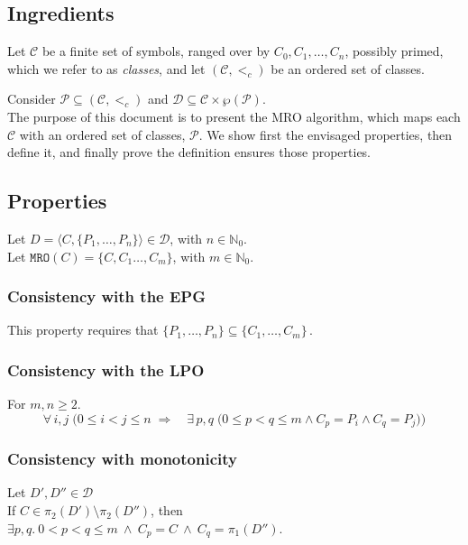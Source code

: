 \documentclass[runningheads]{llncs}
\newcommand*{\CC}{\ensuremath{\mathcal{C}}\xspace}
\newcommand*{\DD}{\ensuremath{\mathcal{D}}\xspace}
\newcommand*{\ordCC}{\ensuremath{(\mathcal{C}, <_c)}\xspace}
\newcommand*{\mro}{\texttt{MRO}}
\newcommand*{\natz}{\ensuremath{\mathbb{N}_0}}
\begin{document}
\subsection{Ingredients}

Let \CC be a finite set of symbols, ranged over by \( C_0, C_1, \ldots, C_n \), possibly primed, which we refer to as \emph{classes}, and let \ordCC be an ordered set of classes. %

Consider $\mathcal P \subseteq \ordCC$ and $\DD \subseteq \CC \times \wp{(\mathcal P)}$.\\

The purpose of this document is to present the MRO algorithm,
which maps each $\CC$ with an ordered set of classes, $\mathcal P$. We show first the envisaged properties, then define it, and finally prove the definition ensures those properties.

\subsection{Properties}
\label{subsec:PropertiesformalSpec}


Let $D = \langle C, \{P_1, \dots, P_n\} \rangle \in \DD$, with $n\in\natz$.\\
Let $\mro(C) = \{C,C_1 \dots, C_m\}$, with $m \in \natz$.\\
\subsubsection{Consistency with the EPG} 
This property requires that
\(
\{P_1, \dots, P_n\} \subseteq \{C_1, \dots, C_m\}\,.
\)


\subsubsection{Consistency with the LPO}
For $m,n \geq 2$.
\begin{equation*}
\forall\,i,j\;\bigl(0\le i<j\le n \;\Longrightarrow \quad \exists\,p,q\;\bigl(0\le p<q\le m \wedge C_p=P_i \wedge C_q=P_j\bigr)\bigr)
\end{equation*}
\subsubsection{Consistency with monotonicity}

Let $D', D'' \in \DD$ \\
If $C \in \pi_2(D') \setminus \pi_2(D'')$, then\\ $\exists p,q. \ 0 < p < q \leq m \ \wedge \ C_p = C \ \wedge \ C_q = \pi_1(D'')$.
\end{document}
